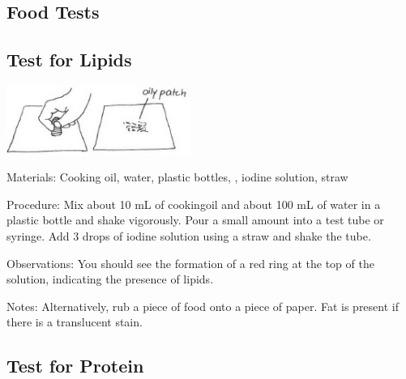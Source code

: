 \begin{multicols}{2}

\section*{Food Tests}


\subsection{Test for Lipids} %

\begin{center}
\includegraphics[width=0.45\textwidth]{./img/vso/food-test-lipids.jpg}
\end{center}

\begin{description*}
\item[Materials:]{Cooking oil, water, plastic bottles, , iodine solution, straw}
\item[Procedure:]{Mix about 10 mL of cookingoil and about 100 mL of water in a plastic bottle and shake vigorously. Pour a small amount into a test tube or syringe. Add 3 drops of iodine solution using a straw and shake the tube.}
\item[Observations:]{You should see the formation of a red ring at the top of the solution, indicating the presence of lipids.}
\item[Notes:]{Alternatively, rub a piece of food onto a piece of paper. Fat is present if there is a translucent stain.}
\end{description*}

\columnbreak

\subsection{Test for Protein} %


\end{multicols}

